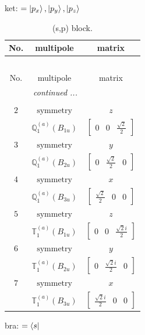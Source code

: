 \documentclass[fleqn,8pt,landscape]{jsarticle}
\begin{document}
\noindent
ket: $=\ket{p_{x}}, \ket{p_{y}}, \ket{p_{z}}$
\renewcommand{\arraystretch}{1.6}
\begin{longtable}{ccc}
\caption{(s,p) block.}
 \\
 \hline \hline
No. & multipole & matrix \\ \hline \endfirsthead

\multicolumn{2}{l}{\tablename\ \thetable{}} \\
 \hline \hline
No. & multipole & matrix \\ \hline \endhead

 \hline \hline
\multicolumn{2}{r}{\footnotesize\it continued ...} \\ \endfoot

 \hline \hline
\multicolumn{2}{r}{} \\ \endlastfoot

$ 2 $ & $ \text{symmetry} $ & $ z $ \\
$  $ & $ \mathbb{Q}_{1}^{(a)}(B_{1u}) $ & $ \begin{bmatrix} 0 & 0 & \frac{\sqrt{2}}{2} \end{bmatrix} $ \\ \hline
$ 3 $ & $ \text{symmetry} $ & $ y $ \\
$  $ & $ \mathbb{Q}_{1}^{(a)}(B_{2u}) $ & $ \begin{bmatrix} 0 & \frac{\sqrt{2}}{2} & 0 \end{bmatrix} $ \\ \hline
$ 4 $ & $ \text{symmetry} $ & $ x $ \\
$  $ & $ \mathbb{Q}_{1}^{(a)}(B_{3u}) $ & $ \begin{bmatrix} \frac{\sqrt{2}}{2} & 0 & 0 \end{bmatrix} $ \\ \hline
$ 5 $ & $ \text{symmetry} $ & $ z $ \\
$  $ & $ \mathbb{T}_{1}^{(a)}(B_{1u}) $ & $ \begin{bmatrix} 0 & 0 & \frac{\sqrt{2} i}{2} \end{bmatrix} $ \\ \hline
$ 6 $ & $ \text{symmetry} $ & $ y $ \\
$  $ & $ \mathbb{T}_{1}^{(a)}(B_{2u}) $ & $ \begin{bmatrix} 0 & \frac{\sqrt{2} i}{2} & 0 \end{bmatrix} $ \\ \hline
$ 7 $ & $ \text{symmetry} $ & $ x $ \\
$  $ & $ \mathbb{T}_{1}^{(a)}(B_{3u}) $ & $ \begin{bmatrix} \frac{\sqrt{2} i}{2} & 0 & 0 \end{bmatrix} $ \\ \hline
\end{longtable}
bra: $=\bra{s}$
\end{document}
